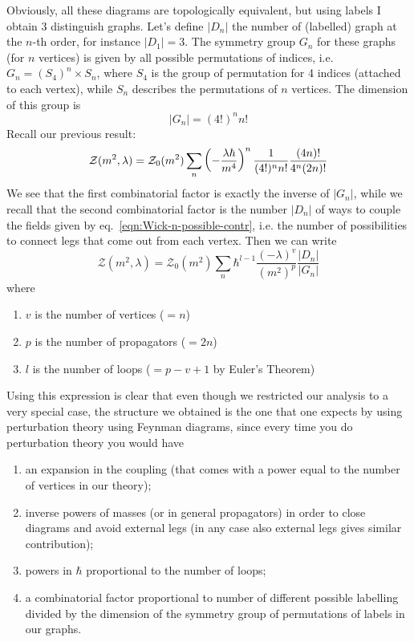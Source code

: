\documentclass[../main/main.tex]{subfiles}
\begin{document}
Obviously, all these diagrams are topologically equivalent, but using labels I obtain 3 distinguish graphs. Let's define $|D_n|$ the number of (labelled) graph at the $n$-th order, for instance $|D_1|=3$.
The symmetry group $G_n$ for these graphs (for $n$ vertices) is given by all possible permutations of indices, i.e. $G_n=(S_4)^n\times S_n$, where $S_4$ is the group of permutation for 4 indices (attached to each vertex), while $S_n$ describes the permutations of $n$ vertices. The dimension of this group is 
\[|G_n|=(4!)^nn!\]
Recall our previous result:
\[\mathcal Z(m^2,\lambda)=\mathcal Z_0(m^2)\sum_n\left(-\frac{\lambda\hbar}{m^4}\right)^n\frac1{(4!)^nn!}\frac{(4n)!}{4^n(2n)!}\]
We see that the first combinatorial factor is exactly the inverse of $|G_n|$, while we recall that the second combinatorial factor is the number $|D_n|$ of ways to couple the fields given by eq.~\eqref{eqn:Wick-n-possible-contr}, i.e. the number of possibilities to connect  legs that come out from each vertex. Then we can write
\[\mathcal Z(m^2,\lambda)=\mathcal Z_0(m^2)\sum_n\hbar^{l-1}\frac{(-\lambda)^v}{(m^2)^p}\frac{|D_n|}{|G_n|}\]
where
\begin{enumerate}[label=\textbullet]
\item $v$ is the number of vertices ($=n$)
\item $p$ is the number of propagators ($=2n$)
\item $l$ is the number of loops ($=p-v+1$ by Euler's Theorem)
\end{enumerate}
Using this expression is clear that even though we restricted our analysis to a very special case, the structure we obtained is the one that one expects by using perturbation theory using Feynman diagrams, since every time you do perturbation theory you would have
\begin{enumerate}[label=\textbullet]
\item an expansion in the coupling (that comes with a power equal to the number of vertices in our theory);
\item inverse powers of masses (or in general propagators) in order to close diagrams and avoid external legs (in any case also external legs gives similar contribution);
\item powers in $\hbar$ proportional to the number of loops;
\item a combinatorial factor proportional to number of different possible labelling divided by the dimension of the symmetry group of permutations of labels in our graphs.
\end{enumerate}
\end{document}
